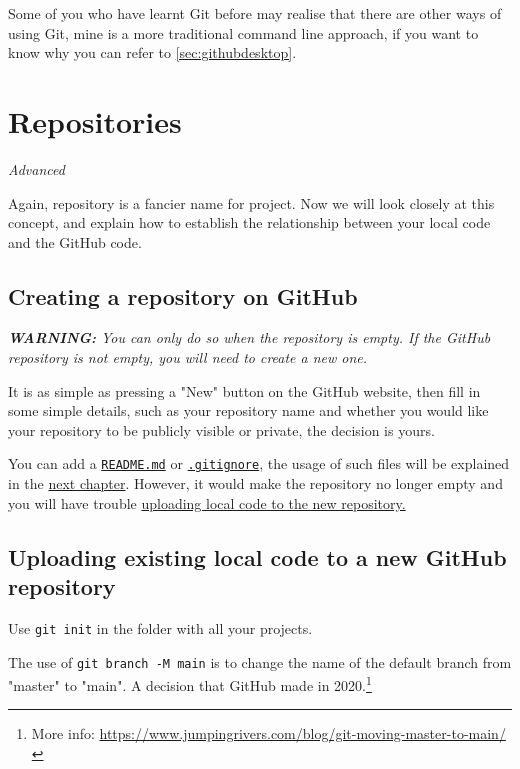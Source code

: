 Some of you who have learnt Git before may realise that there are other ways of using Git, mine is a more traditional command line approach, if you want to know why you can refer to \cref{sec:githubdesktop}.

\section{Repositories}

\textit{Advanced}
\vspace{6mm}

Again, repository is a fancier name for project. Now we will look closely at this concept, and explain how to establish the relationship between your local code and the GitHub code.

\subsection{Creating a repository on GitHub}
\label{sec:gituploadgithub}

\textit{\textbf{WARNING: } You can only do so when the repository is empty. If the GitHub repository is not empty, you will need to create a new one.}

It is as simple as pressing a "New" button on the GitHub website, then fill in some simple details, such as your repository name and whether you would like your repository to be publicly visible or private, the decision is yours.

You can add a \hyperref[sec:readme]{\texttt{README.md}} or \hyperref[sec:gitignore]{\texttt{.gitignore}}, the usage of such files will be explained in the \hyperref[sec:projstructure]{next chapter}. However, it would make the repository no longer empty and you will have trouble \hyperref[sec:gituploadgithub]{uploading local code to the new repository.}

\subsection{Uploading existing local code to a new GitHub repository}
\label{sec:gitinit} 

Use \texttt{git init} in the folder with all your projects.

The use of \texttt{git branch -M main} is to change the name of the default branch from "master" to "main". A decision that GitHub made in 2020.\footnote{More info: \url{https://www.jumpingrivers.com/blog/git-moving-master-to-main/}}

